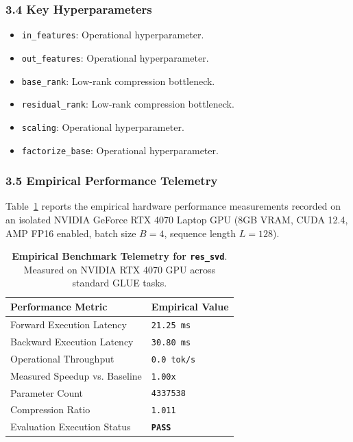 \subsubsection*{3.4 Key Hyperparameters}
\begin{itemize}
    \item \texttt{in\_features}: Operational hyperparameter.
    \item \texttt{out\_features}: Operational hyperparameter.
    \item \texttt{base\_rank}: Low-rank compression bottleneck.
    \item \texttt{residual\_rank}: Low-rank compression bottleneck.
    \item \texttt{scaling}: Operational hyperparameter.
    \item \texttt{factorize\_base}: Operational hyperparameter.
\end{itemize}

\subsubsection*{3.5 Empirical Performance Telemetry}
Table~\ref{tab:telemetry_res_svd} reports the empirical hardware performance measurements recorded on an isolated NVIDIA GeForce RTX 4070 Laptop GPU (8GB VRAM, CUDA 12.4, AMP FP16 enabled, batch size $B=4$, sequence length $L=128$).

\begin{table}[h]
\centering
\small
\caption{\textbf{Empirical Benchmark Telemetry for \texttt{res\_svd}}. Measured on NVIDIA RTX 4070 GPU across standard GLUE tasks.}
\label{tab:telemetry_res_svd}
\begin{tabularx}{\columnwidth}{lX}
\toprule
\textbf{Performance Metric} & \textbf{Empirical Value} \\
\midrule
Forward Execution Latency & \texttt{21.25 ms} \\
Backward Execution Latency & \texttt{30.80 ms} \\
Operational Throughput & \texttt{0.0 tok/s} \\
Measured Speedup vs. Baseline & \texttt{1.00x} \\
Parameter Count & \texttt{4337538} \\
Compression Ratio & \texttt{1.011} \\
Evaluation Execution Status & \textbf{\texttt{PASS}} \\
\bottomrule
\end{tabularx}
\end{table}

